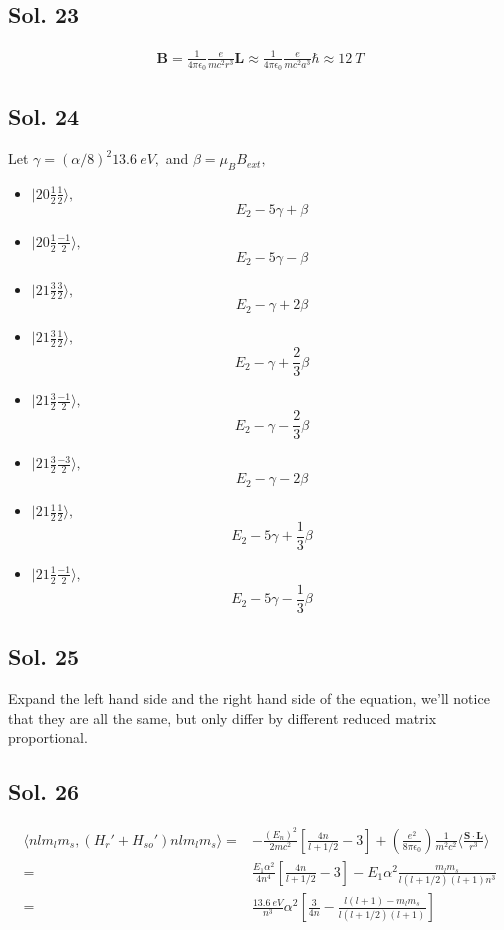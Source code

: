 \subsection*{Sol. 23}
\begin{align*}
    \bm B = \frac{1}{4\pi\epsilon_0}
    \frac{e}{mc^2r^3}\bm L 
    \approx
    \frac{1}{4\pi\epsilon_0}
    \frac{e}{mc^2a^3}\hbar \approx \qty{12}{T}
\end{align*}

\subsection*{Sol. 24}
Let $\gamma = (\alpha/8)^2\qty{13.6}{eV},$ and $\beta = \mu_BB_{ext},$
\begin{itemize}
    \item $|20\frac{1}{2}\frac{1}{2}\rangle,$
$$
E_2-5\gamma + \beta
$$
\item  $|20\frac{1}{2}\frac{-1}{2}\rangle,$
$$
E_2-5\gamma - \beta
$$
\item  $|21\frac{3}{2}\frac{3}{2}\rangle,$
$$
E_2-\gamma + 2\beta
$$
\item $|21\frac{3}{2}\frac{1}{2}\rangle,$
$$
E_2-\gamma + \frac{2}{3}\beta
$$
\item  $|21\frac{3}{2}\frac{-1}{2}\rangle,$
$$
E_2-\gamma - \frac{2}{3}\beta
$$
\item $|21\frac{3}{2}\frac{-3}{2}\rangle,$
$$
E_2-\gamma - 2\beta
$$
\item $|21\frac{1}{2}\frac{1}{2}\rangle,$
$$
E_2-5\gamma + \frac{1}{3}\beta
$$
\item  $|21\frac{1}{2}\frac{-1}{2}\rangle,$
$$
E_2-5\gamma -\frac{1}{3}\beta
$$

\end{itemize}



\subsection*{Sol. 25}
Expand the left hand side and the right hand side of the equation, we'll notice that they are all the same, but only differ by different reduced matrix proportional.

\subsection*{Sol. 26}
\begin{align*}
    \langle nlm_lm_s, (H_r'+H_{so}') nlm_lm_s\rangle = &
    -\frac{(E_n)^2}{2mc^2}\left[
    \frac{4n}{l+1/2}-3
    \right]
    +\left(
    \frac{e^2}{8\pi\epsilon_0}
    \right)
    \frac{1}{m^2c^2}
    \langle \frac{\bm S\cdot \bm L}{r^3}\rangle\\
    =&\frac{E_1\alpha^2}{4n^4}\left[
    \frac{4n}{l+1/2}-3
    \right]
    -
    E_1\alpha^2
    \frac{m_lm_s}{l(l+1/2)(l+1)n^3}\\
    =&
    \frac{\qty{13.6}{eV}}{n^3}\alpha^2
    \left[\frac{3}{4n}-
    \frac{l(l+1)-m_lm_s}{l(l+1/2)(l+1)}
    \right]
\end{align*}


